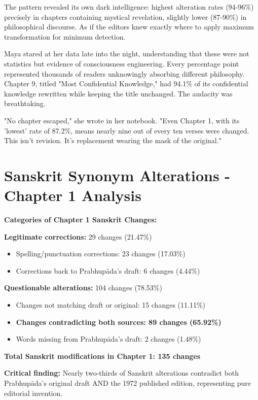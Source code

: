 \documentclass[11pt,twoside]{book}
\begin{document}
The pattern revealed its own dark intelligence: highest alteration rates (94-96\%) precisely in chapters containing mystical revelation, slightly lower (87-90\%) in philosophical discourse. As if the editors knew exactly where to apply maximum transformation for minimum detection.

Maya stared at her data late into the night, understanding that these were not statistics but evidence of consciousness engineering. Every percentage point represented thousands of readers unknowingly absorbing different philosophy. Chapter 9, titled "Most Confidential Knowledge," had 94.1\% of its confidential knowledge rewritten while keeping the title unchanged. The audacity was breathtaking.

"No chapter escaped," she wrote in her notebook. "Even Chapter 1, with its 'lowest' rate of 87.2\%, means nearly nine out of every ten verses were changed. This isn't revision. It's replacement wearing the mask of the original."
\section*{Sanskrit Synonym Alterations - Chapter 1 Analysis}
\label{sec:org5ef0499}

\textbf{\textbf{Categories of Chapter 1 Sanskrit Changes:}}

\textbf{\textbf{Legitimate corrections:}} 29 changes (21.47\%)
\begin{itemize}
\item Spelling/punctuation corrections: 23 changes (17.03\%)
\item Corrections back to Prabhupāda's draft: 6 changes (4.44\%)
\end{itemize}

\textbf{\textbf{Questionable alterations:}} 104 changes (78.53\%)  
\begin{itemize}
\item Changes not matching draft or original: 15 changes (11.11\%)
\item \textbf{\textbf{Changes contradicting both sources: 89 changes (65.92\%)}}
\item Words missing from Prabhupāda's draft: 2 changes (1.48\%)
\end{itemize}

\textbf{\textbf{Total Sanskrit modifications in Chapter 1: 135 changes}}

\textbf{\textbf{Critical finding:}} Nearly two-thirds of Sanskrit alterations contradict both Prabhupāda's original draft AND the 1972 published edition, representing pure editorial invention.
\end{document}
